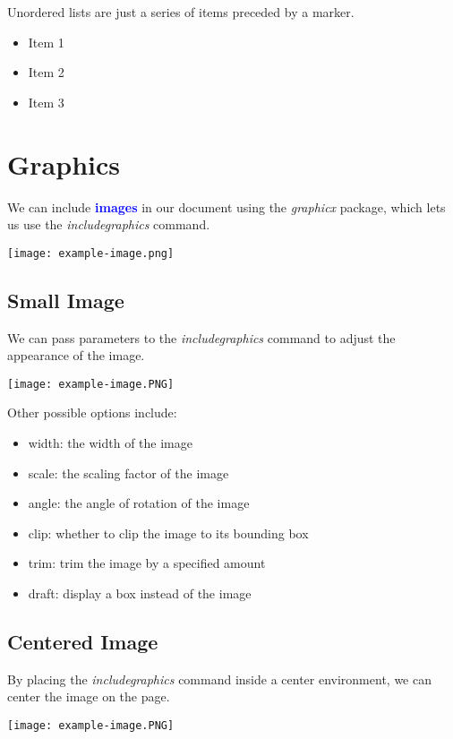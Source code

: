 \documentclass{article}
\newcommand{\kw}[1]{\textcolor{blue}{\textbf{#1}}}
\newcommand{\cmd}[1]{\textit{#1}}
\begin{document}
Unordered lists are just a series of items preceded by a marker.

\begin{itemize}
  \item Item 1
  \item Item 2
  \item Item 3
\end{itemize}

\section{Graphics}

We can include \kw{images} in our document using the \cmd{graphicx} package, which lets us use the
\cmd{includegraphics} command.

\texttt{[image: example-image.png]}

\subsection{Small Image}

We can pass parameters to the \cmd{includegraphics} command to adjust the appearance of the image.

\texttt{[image: example-image.PNG]}

Other possible options include:

\begin{itemize}
  \item width: the width of the image
  \item scale: the scaling factor of the image
  \item angle: the angle of rotation of the image
  \item clip: whether to clip the image to its bounding box
  \item trim: trim the image by a specified amount
  \item draft: display a box instead of the image
\end{itemize}

\subsection{Centered Image}

By placing the \cmd{includegraphics} command inside a center environment, we can center the
image on the page.

\begin{center}
  \texttt{[image: example-image.PNG]}
\end{center}
\end{document}
